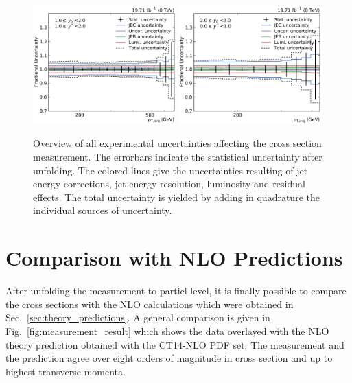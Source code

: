 \begin{figure}[htbp]
    \includegraphics[width=0.49\textwidth]{figures/measurement/exp_unc_overview_yb1ys1.pdf}\hfill
    \includegraphics[width=0.49\textwidth]{figures/measurement/exp_unc_overview_yb2ys0.pdf}
    \caption[Overview of experimental uncertainties]{Overview of all
    experimental uncertainties affecting the cross section measurement. The
    errorbars indicate the statistical uncertainty after unfolding. The colored
    lines give the uncertainties resulting of jet energy corrections, jet energy
    resolution, luminosity and residual effects. The total uncertainty is yielded by
    adding in quadrature the individual sources of uncertainty.}
    \label{fig:exp_unc_overview}
\end{figure}

\section{Comparison with NLO Predictions}
\label{sec:nlo_comparisons}

After unfolding the measurement to particl-level, it is finally possible to
compare the cross sections with the NLO calculations which were obtained in
Sec.~\ref{sec:theory_predictions}. A general comparison is given in
Fig.~\ref{fig:measurement_result} which shows the data overlayed with the NLO
theory prediction obtained with the CT14-NLO PDF set. The measurement and the
prediction agree over eight orders of magnitude in cross section and up to
highest transverse momenta.

